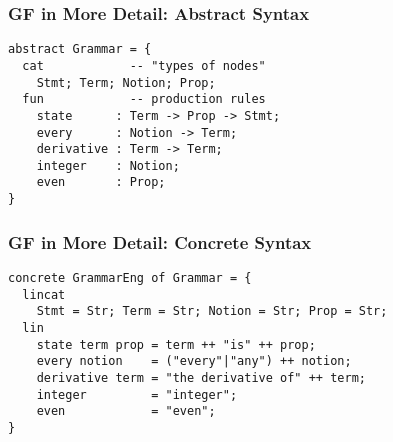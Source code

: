 \begin{frame}[fragile]
    \frametitle{GF in More Detail: Abstract Syntax}
    \centering
    

    \begin{lstlisting}[language=GF]
abstract Grammar = {
  cat            -- "types of nodes"
    Stmt; Term; Notion; Prop;
  fun            -- production rules
    state      : Term -> Prop -> Stmt;
    every      : Notion -> Term;
    derivative : Term -> Term;
    integer    : Notion;
    even       : Prop;
}
    \end{lstlisting}
\end{frame}


\begin{frame}[fragile]
    \frametitle{GF in More Detail: Concrete Syntax}
    \centering
    

    \begin{lstlisting}[language=GF]
concrete GrammarEng of Grammar = {
  lincat
    Stmt = Str; Term = Str; Notion = Str; Prop = Str;
  lin
    state term prop = term ++ "is" ++ prop;
    every notion    = ("every"|"any") ++ notion;
    derivative term = "the derivative of" ++ term;
    integer         = "integer";
    even            = "even";
}
    \end{lstlisting}
\end{frame}
